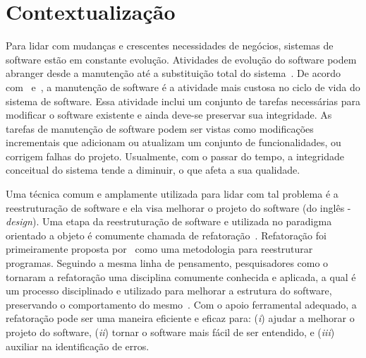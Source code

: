 
\section{Contextualização}\label{sec:contexto}


Para lidar com mudanças e crescentes necessidades de negócios, sistemas de software estão em constante evolução.
Atividades de evolução do software podem abranger desde a manutenção até a substituição total do sistema~\cite{seacord_2003}. 
De acordo com~ e~, a manutenção de software é a atividade mais custosa no ciclo de vida do sistema de software. 
Essa atividade inclui um conjunto de tarefas necessárias para modificar o software existente e ainda deve-se preservar sua integridade.
As tarefas de manutenção de software podem ser vistas como modificações incrementais que adicionam ou atualizam um conjunto de funcionalidades, ou corrigem falhas do projeto.
Usualmente, com o passar do tempo, a integridade conceitual do sistema tende a diminuir, o que afeta a sua qualidade.

Uma técnica comum e amplamente utilizada para lidar com tal problema é a reestruturação de software e ela visa melhorar o projeto do software (do inglês - \emph{design}). Uma etapa da reestruturação de software e utilizada no paradigma orientado a objeto é comumente chamada de refatoração~\cite{OPDYKE_1992, Fowler1999, Mens04}. Refatoração foi primeiramente proposta por~ como uma metodologia para reestruturar programas. Seguindo a mesma linha de pensamento, pesquisadores como o  tornaram a refatoração uma disciplina comumente conhecida e aplicada, a qual é um processo disciplinado e utilizado para melhorar a estrutura do software, preservando o comportamento do mesmo~\cite{Fowler1999}. Com o apoio ferramental adequado, a refatoração pode ser uma maneira eficiente e eficaz para: (\textit{i}) ajudar a melhorar o projeto do software, (\textit{ii}) tornar o software mais fácil de ser entendido, e (\textit{iii}) auxiliar na identificação de erros. %


